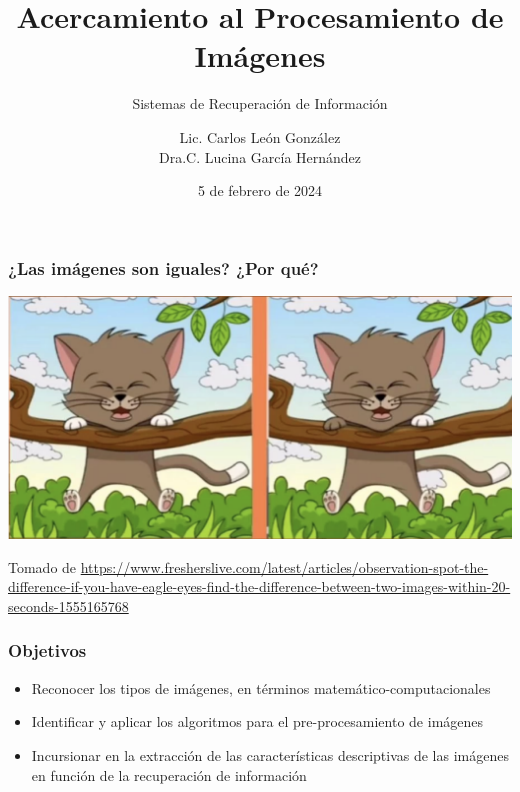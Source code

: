 \documentclass[
10pt, %
aspectratio=169, %
]{beamer}
\title[Short Title]{Acercamiento al Procesamiento de Imágenes}
\subtitle{Sistemas de Recuperación de Información}
\author{Lic. Carlos León González \\ Dra.C. Lucina García Hernández}
\institute[UC]{Facultad de Matem\'atica y Computaci\'on \\ Universidad de La Habana \\ \smallskip }
\date{5 de febrero de  2024} %
\begin{document}
	
	
	
	\begin{frame}
		\titlepage
	\end{frame}
	
	\begin{frame}
		
		\frametitle{¿Las imágenes son iguales? ¿Por qué?}
		
		\vspace{1\baselineskip}
			
		\centering
		\includegraphics[scale=0.5]{gato.png} 
	
		{\scriptsize Tomado de \url{https://www.fresherslive.com/latest/articles/observation-spot-the-difference-if-you-have-eagle-eyes-find-the-difference-between-two-images-within-20-seconds-1555165768}}
		
	\end{frame}
	
	\begin{frame}
		
		\frametitle{Objetivos}
		
		\begin{itemize}
			\item Reconocer los tipos de imágenes, en términos matemático-computacionales
			
			\item Identificar y aplicar los algoritmos para el pre-procesamiento de imágenes
			
			\item Incursionar en la extracción de las características descriptivas de las imágenes en función de la recuperación de información
		\end{itemize}
				
	\end{frame}
		
\end{document}
